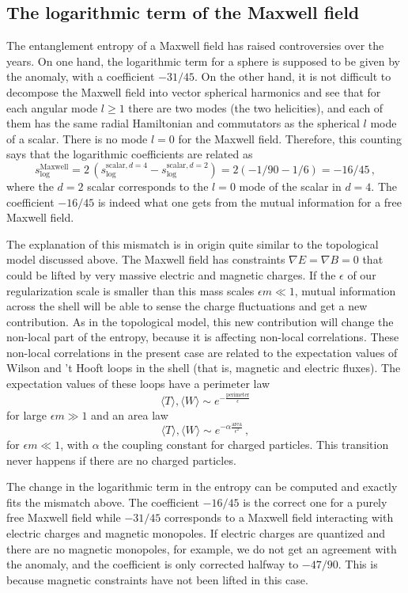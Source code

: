 \documentclass[11pt]{article}
\numberwithin{equation}{section}
\newcommand{\be}{\begin{equation}}
\newcommand{\ee}{\end{equation}}
\begin{document}
\subsection{The logarithmic term of the Maxwell field}

The entanglement entropy of a Maxwell field has raised controversies over the years.  
On one hand, the logarithmic term for a sphere is supposed to be given by the anomaly, with a coefficient $-31/45$. On the other hand, it is not difficult to decompose the  Maxwell field into vector spherical harmonics and see that for each angular mode $l\ge 1$ there are two modes (the two helicities), and each of them has the same radial Hamiltonian and commutators as the spherical $l$ mode of a scalar. There is no mode $l=0$ for the Maxwell field.  Therefore, this counting says that the logarithmic coefficients are related as 
\be
s^{\textrm{Maxwell}}_{\textrm{log}}=2\,(s^{\textrm{scalar}, d=4}_{\textrm{log}}- s^{\textrm{scalar}, d=2}_{\textrm{log}})=2(-1/90-1/6)=-16/45\,,   
\ee
where the $d=2$ scalar corresponds to the $l=0$ mode of the scalar in $d=4$. 
The coefficient $-16/45$ is indeed what one gets from the mutual information for a free Maxwell field.

The explanation of this mismatch is in origin quite similar to the topological model discussed above. The Maxwell field has constraints $\nabla E=\nabla B=0$ that could be lifted by very massive electric and magnetic charges. If the $\epsilon$ of our regularization scale is smaller than this mass scales $\epsilon m\ll 1$, mutual information across the shell will be able to sense the charge fluctuations and get a new contribution. As in the topological model, this new contribution will change the non-local part of the entropy, because it is affecting non-local correlations. These non-local correlations in the present case are related to the expectation values of Wilson and 't Hooft loops in the shell (that is, magnetic and electric fluxes). The expectation values of these loops have a perimeter law
\be\label{perr}
\langle T \rangle,\langle W \rangle \sim e^{-\frac{\textrm{perimeter}}{\epsilon}}
\ee  
for large $\epsilon m \gg 1$ and an area law 
\be \label{arr}
\langle T \rangle,\langle W \rangle \sim e^{-\alpha \frac{\textrm{area}}{\epsilon^2}}\,,
\ee 
for $\epsilon m \ll 1$, with $\alpha$ the coupling constant for charged particles. This transition never happens if there are no charged particles. 

The change in the logarithmic term in the entropy can be computed and exactly fits the mismatch above. The coefficient $-16/45$ is the correct one for a purely free Maxwell field while $-31/45$ corresponds to a Maxwell field interacting with electric charges and magnetic monopoles. If electric charges are quantized and there are no magnetic monopoles, for example, we do not get an agreement with the anomaly, and the coefficient is only corrected halfway to $-47/90$. This is because magnetic constraints have not been lifted in this case.  
\end{document}
